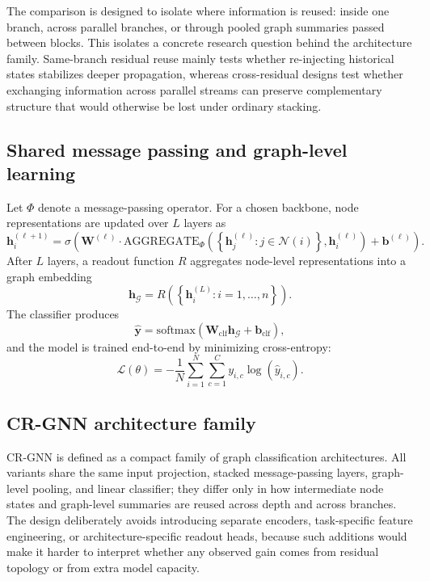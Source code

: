 The comparison is designed to isolate where information is reused: inside one branch, across parallel branches, or through pooled graph summaries passed between blocks. This isolates a concrete research question behind the architecture family. Same-branch residual reuse mainly tests whether re-injecting historical states stabilizes deeper propagation, whereas cross-residual designs test whether exchanging information across parallel streams can preserve complementary structure that would otherwise be lost under ordinary stacking.


\subsection{Shared message passing and graph-level learning}

Let $\Phi$ denote a message-passing operator. For a chosen backbone, node representations are updated over $L$ layers as
\begin{equation}
\mathbf{h}_i^{(\ell+1)} = \sigma\left(\mathbf{W}^{(\ell)} \cdot \text{AGGREGATE}_{\Phi}\left(\left\{\mathbf{h}_j^{(\ell)} : j \in \mathcal{N}(i)\right\}, \mathbf{h}_i^{(\ell)}\right) + \mathbf{b}^{(\ell)}\right).
\end{equation}
After $L$ layers, a readout function $R$ aggregates node-level representations into a graph embedding
\begin{equation}
\mathbf{h}_{\mathcal{G}} = R\left(\left\{\mathbf{h}_i^{(L)} : i = 1, \ldots, n\right\}\right).
\end{equation}
The classifier produces
\begin{equation}
\hat{\mathbf{y}} = \text{softmax}\left(\mathbf{W}_{\text{clf}} \mathbf{h}_{\mathcal{G}} + \mathbf{b}_{\text{clf}}\right),
\end{equation}
and the model is trained end-to-end by minimizing cross-entropy:
\begin{equation}
\mathcal{L}(\theta) = -\frac{1}{N} \sum_{i=1}^{N} \sum_{c=1}^{C} y_{i,c} \log(\hat{y}_{i,c}).
\end{equation}

\subsection{CR-GNN architecture family}
\label{sec:model}

CR-GNN is defined as a compact family of graph classification architectures. All variants share the same input projection, stacked message-passing layers, graph-level pooling, and linear classifier; they differ only in how intermediate node states and graph-level summaries are reused across depth and across branches. The design deliberately avoids introducing separate encoders, task-specific feature engineering, or architecture-specific readout heads, because such additions would make it harder to interpret whether any observed gain comes from residual topology or from extra model capacity.



